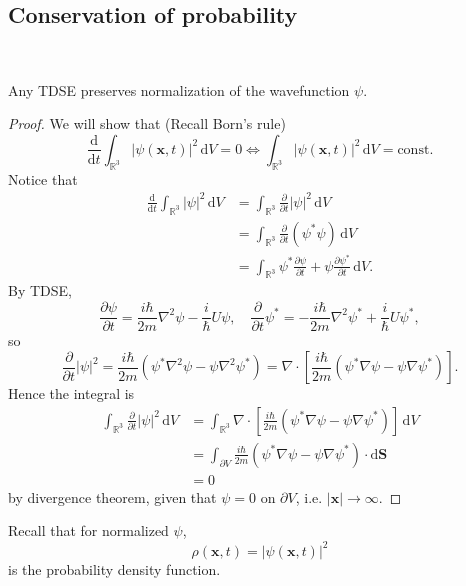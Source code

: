\documentclass[a4paper,11pt]{article}
\begin{document}
\subsection{Conservation of probability}\
\vspace{-1.5em}
\begin{proposition}
    Any TDSE preserves normalization of the wavefunction $\psi$. 
\end{proposition}
\begin{proof}
    We will show that (Recall Born's rule)
    \[
        \frac{\mathrm{d}}{\mathrm{d}t} \int_{\mathbb{R}^3} | \psi(\mathbf{x},t)|^2 \,\mathrm{d}V = 0 \iff \int_{\mathbb{R}^3} | \psi(\mathbf{x},t)|^2 \,\mathrm{d}V = \text{const}.
    \]
    Notice that 
    \begin{align*}
        \frac{\mathrm{d}}{\mathrm{d}t} \int_{\mathbb{R}^3} | \psi|^2 \,\mathrm{d}V &= \int_{ \mathbb{R}^{3}} \frac{\partial }{\partial t}|\psi|^2  \,\mathrm{d}V\\ 
        &=\int_{\mathbb{R}^3} \frac{\partial }{\partial t}(\psi^* \psi)  \,\mathrm{d}V\\ 
        &= \int_{\mathbb{R}^3} \psi^* \frac{\partial \psi}{\partial t} + \psi\frac{\partial \psi^*}{\partial t}   \,\mathrm{d}V. 
    \end{align*}
    By TDSE, 
    \[
        \frac{\partial \psi}{\partial t} = \frac{i\hbar}{2m}\nabla^2 \psi - \frac{i}{\hbar} U \psi,\quad \frac{\partial}{\partial t} \psi^*=-\frac{i \hbar}{2 m} \nabla^2 \psi^*+\frac{i}{\hbar} U \psi^*,
    \]
    so 
    \[
        \frac{\partial}{\partial t}|\psi|^2=\frac{i \hbar}{2 m}\left(\psi^* \nabla^2 \psi-\psi \nabla^2 \psi^*\right)=\nabla \cdot\left[\frac{i \hbar}{2 m}\left(\psi^* \nabla \psi-\psi \nabla \psi^*\right)\right]. 
    \]
    Hence the integral is 
    \begin{align*}
        \int_{ \mathbb{R}^{3}} \frac{\partial }{\partial t}|\psi|^2  \,\mathrm{d}V &= \int_{\mathbb{R}^3} \nabla \cdot\left[\frac{i \hbar}{2 m}\left(\psi^* \nabla \psi-\psi \nabla \psi^*\right)\right] \,\mathrm{d}V\\ 
        &= \int_{\partial V} \frac{i \hbar}{2 m}\left(\psi^* \nabla \psi-\psi \nabla \psi^*\right) \cdot \mathrm{d} \mathbf{S}\\ 
        &= 0 
    \end{align*}
    by divergence theorem, given that $ \psi = 0 $ on $ \partial V $, i.e. $ |\mathbf{x}|\to \infty  $. 
\end{proof}

Recall that for normalized $ \psi $,
\[
    \rho(\mathbf{x},t) = | \psi(\mathbf{x},t)|^2
\]
is the probability density function. 
\end{document}
